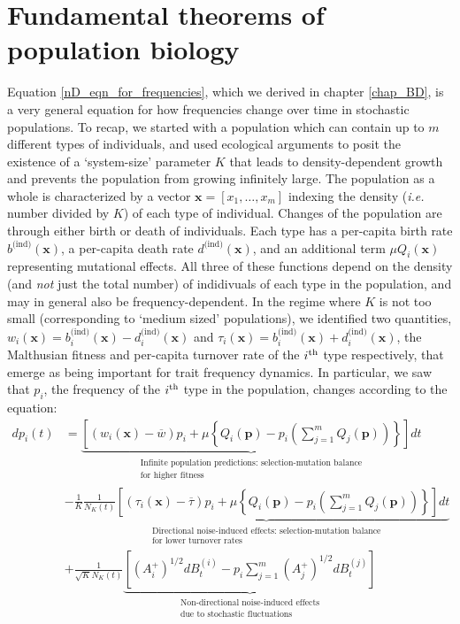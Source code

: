 \section{Fundamental theorems of population biology}
Equation \eqref{nD_eqn_for_frequencies}, which we derived in chapter \ref{chap_BD}, is a very general equation for how frequencies change over time in stochastic populations. To recap, we started with a population which can contain up to $m$ different types of individuals, and used ecological arguments to posit the existence of a `system-size' parameter $K$ that leads to density-dependent growth and prevents the population from growing infinitely large. The population as a whole is characterized by a vector $\mathbf{x} = [x_1, \ldots, x_m]$ indexing the density (\emph{i.e.} number divided by $K$) of each type of individual. Changes of the population are through either birth or death of individuals. Each type has a per-capita birth rate $b^{\textrm{(ind)}}(\mathbf{x})$, a per-capita death rate $d^{\textrm{(ind)}}(\mathbf{x})$, and an additional term $\mu Q_{i}(\mathbf{x})$ representing mutational effects. All three of these functions depend on the density (and \emph{not} just the total number) of indidivuals of each type in the population, and may in general also be frequency-dependent. In the regime where $K$ is not too small (corresponding to `medium sized' populations), we identified two quantities, $w_i(\mathbf{x}) = b^{\textrm{(ind)}}_{i}(\mathbf{x}) - d^{\textrm{(ind)}}_{i}(\mathbf{x})$ and $\tau_i(\mathbf{x}) = b^{\textrm{(ind)}}_{i}(\mathbf{x}) + d^{\textrm{(ind)}}_{i}(\mathbf{x})$, the Malthusian fitness and per-capita turnover rate of the $i\textsuperscript{th}$ type respectively, that emerge as being important for trait frequency dynamics. In particular, we saw that $p_i$, the frequency of the $i\textsuperscript{th}$ type in the population, changes according to the equation:
\begin{equation}
\label{nD_stochastic_RM}
\begin{aligned}
dp_i(t) &= \underbrace{\left[(w_i(\mathbf{x}) - \overline{w})p_i + \mu\left\{Q_i(\mathbf{p}) - p_i\left(\sum\limits_{j=1}^{m}Q_j(\mathbf{p})\right)\right\}\right]dt}_{\substack{\text{Infinite population predictions: selection-mutation balance} \\ \text{for higher fitness}}}\\
&- \frac{1}{K}\underbrace{\frac{1}{N_{K}(t)}\left[(\tau_i(\mathbf{x}) - \overline{\tau})p_i + \mu\left\{Q_i(\mathbf{p}) - p_i\left(\sum\limits_{j=1}^{m}Q_j(\mathbf{p})\right)\right\}\right]dt}_{\substack{\text{Directional noise-induced effects: selection-mutation balance}\\\text{for lower turnover rates}}}\\
&+ \frac{1}{\sqrt{K}N_{K}(t)}\underbrace{\left[\left(A^{+}_{i}\right)^{1/2}dB^{(i)}_t - p_i\sum\limits_{j=1}^{m}\left(A^{+}_{j}\right)^{1/2}dB^{(j)}_t\right]}_{\substack{\text{Non-directional noise-induced effects}\\\text{due to stochastic fluctuations}}}
\end{aligned}
\end{equation}
